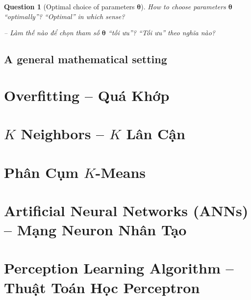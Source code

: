 \documentclass{article}
\newtheorem{question}{Question}
\begin{document}
\begin{question}[Optimal choice of parameters $\boldsymbol{\theta}$]
	How to choose parameters $\boldsymbol{\theta}$ ``optimally''? ``Optimal'' in which sense?
	
	-- Làm thế nào để chọn tham số $\boldsymbol{\theta}$ ``tối ưu''? ``Tối ưu'' theo nghĩa nào?
\end{question}

\subsection{A general mathematical setting}


\section{Overfitting -- Quá Khớp}


\section{$K$ Neighbors -- $K$ Lân Cận}


\section{Phân Cụm $K$-Means}


\section{Artificial Neural Networks (ANNs) -- Mạng Neuron Nhân Tạo}


\section{Perception Learning Algorithm -- Thuật Toán Học Perceptron}

\end{document}

